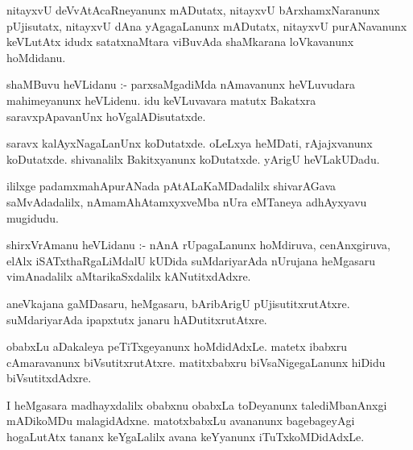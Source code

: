 \documentclass{article}
\begin{document}
\begin{mn}
nitayxvU  deVvAtAcaRneyanunx  mADutatx,  nitayxvU  bArxhamxNaranunx  pUjisutatx,  nitayxvU  dAna  yAgagaLanunx  
mADutatx,  nitayxvU  purANavanunx  keVLutAtx  idudx  satatxnaMtara  viBuvAda  shaMkarana  loVkavanunx  hoMdidanu.
\end{mn}

\begin{mn}
shaMBuvu  heVLidanu :- parxsaMgadiMda  nAmavanunx  heVLuvudara  mahimeyanunx  heVLidenu.  idu  keVLuvavara  matutx  
Bakatxra  saravxpApavanUnx  hoVgalADisutatxde.
\end{mn}

\begin{mn}
saravx kalAyxNagaLanUnx  koDutatxde.  oLeLxya  heMDati,  rAjajxvanunx  koDutatxde.  shivanalilx  Bakitxyanunx  
koDutatxde.  yArigU  heVLakUDadu.
\end{mn}

\begin{mn}
ililxge  padamxmahApurANada  pAtALaKaMDadalilx  shivarAGava saMvAdadalilx,  nAmamAhAtamxyxveMba  nUra  eMTaneya  
adhAyxyavu  mugidudu.
\end{mn}




\begin{mn}
shirxVrAmanu  heVLidanu :- nAnA  rUpagaLanunx  hoMdiruva,  cenAnxgiruva,  elAlx  iSATxthaRgaLiMdalU  kUDida  
suMdariyarAda  nUrujana  heMgasaru  vimAnadalilx  aMtarikaSxdalilx  kANutitxdAdxre.
\end{mn}

\begin{mn}
aneVkajana  gaMDasaru,  heMgasaru,  bAribArigU  pUjisutitxrutAtxre.  suMdariyarAda  ipapxtutx  janaru  hADutitxrutAtxre.
\end{mn}

\begin{mn}
obabxLu  aDakaleya  peTiTxgeyanunx  hoMdidAdxLe.  matetx  ibabxru  cAmaravanunx  biVsutitxrutAtxre.  
matitxbabxru  biVsaNigegaLanunx  hiDidu  biVsutitxdAdxre.
\end{mn}

\begin{mn}
I  heMgasara  madhayxdalilx  obabxnu  obabxLa  toDeyanunx  talediMbanAnxgi  mADikoMDu  malagidAdxne.  
matotxbabxLu  avananunx  bagebageyAgi  hogaLutAtx  tananx  keYgaLalilx  avana  keYyanunx  iTuTxkoMDidAdxLe.
\end{mn}
\end{document}
